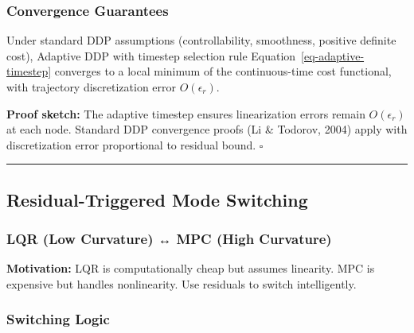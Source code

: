 \documentclass[
  letterpaper,
  DIV=11,
  numbers=noendperiod]{scrartcl}
\begin{document}
\subsubsection{Convergence Guarantees}\label{convergence-guarantees}

\begin{tcolorbox}[enhanced jigsaw, breakable, bottomtitle=1mm, title=\textcolor{quarto-callout-important-color}{\faExclamation}\hspace{0.5em}{Theorem 2.1: Convergence of Adaptive DDP}, opacityback=0, left=2mm, titlerule=0mm, colframe=quarto-callout-important-color-frame, opacitybacktitle=0.6, bottomrule=.15mm, toptitle=1mm, toprule=.15mm, arc=.35mm, leftrule=.75mm, rightrule=.15mm, colback=white, colbacktitle=quarto-callout-important-color!10!white, coltitle=black]

Under standard DDP assumptions (controllability, smoothness, positive
definite cost), Adaptive DDP with timestep selection rule
Equation~\ref{eq-adaptive-timestep} converges to a local minimum of the
continuous-time cost functional, with trajectory discretization error
\(O(\epsilon_r)\).

\end{tcolorbox}

\textbf{Proof sketch:} The adaptive timestep ensures linearization
errors remain \(O(\epsilon_r)\) at each node. Standard DDP convergence
proofs (Li \& Todorov, 2004) apply with discretization error
proportional to residual bound. \(\square\)

\begin{center}\rule{0.5\linewidth}{0.5pt}\end{center}

\subsection{Residual-Triggered Mode Switching}\label{sec-mode-switching}

\subsubsection{LQR (Low Curvature) ↔ MPC (High
Curvature)}\label{lqr-low-curvature-mpc-high-curvature}

\textbf{Motivation:} LQR is computationally cheap but assumes linearity.
MPC is expensive but handles nonlinearity. Use residuals to switch
intelligently.

\subsubsection{Switching Logic}\label{switching-logic}
\end{document}
